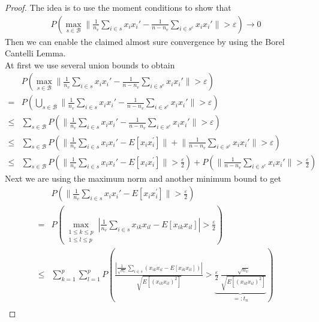 \documentclass[Research_Module_ES.tex]{subfiles}
\begin{document}
\begin{proof}
 The idea is to use the moment conditions to show that 
 \begin{align*}
 P\left( \max_{s\in \mathcal{B}}\biggl\lVert \frac{1}{n_v}\sum_{i\in s}x_ix_i' - \frac{1}{n-n_v}\sum_{i\in s^c}x_ix_i'\biggr\rVert>\varepsilon\right)\to0
 \end{align*}
Then we can enable the claimed almost sure convergence by using the Borel Cantelli Lemma.\\

At first we use several union bounds to obtain
\begin{align}\nonumber
&P\left( \max_{s\in \mathcal{B}}\biggl\lVert \frac{1}{n_v}\sum_{i\in s}x_ix_i' - \frac{1}{n-n_v}\sum_{i\in s^c}x_ix_i'\biggr\rVert>\varepsilon\right)\\\nonumber
=&P\left( \bigcup_{s\in \mathcal{B}}\biggl\lVert \frac{1}{n_v}\sum_{i\in s}x_ix_i' - \frac{1}{n-n_v}\sum_{i\in s^c}x_ix_i'\biggr\rVert>\varepsilon\right)\\\nonumber
\leq&\sum_{s\in \mathcal{B}}P\left(\biggl\lVert \frac{1}{n_v}\sum_{i\in s}x_ix_i' - \frac{1}{n-n_v}\sum_{i\in s^c}x_ix_i'\biggr\rVert>\varepsilon\right)\\\nonumber
\leq&\sum_{s\in \mathcal{B}}P\left(\biggl\lVert \frac{1}{n_v}\sum_{i\in s}x_ix_i'-E[x_i x_i^\prime]\biggr\rVert+\biggl\lVert \frac{1}{n-n_v}\sum_{i\in s^c}x_ix_i'\biggr\rVert>\varepsilon\right)\\
\leq&\sum_{s\in \mathcal{B}}P\left(\biggl\lVert \frac{1}{n_v}\sum_{i\in s}x_ix_i'-E[x_i x_i^\prime]\biggr\rVert>\frac{\varepsilon}{2}\right)+P\left(\biggl\lVert \frac{1}{n-n_v}\sum_{i\in s^c}x_ix_i'\biggr\rVert>\frac{\varepsilon}{2}\right)\label{Viereck}
\end{align}
Next we are using the maximum norm and another minimum bound to get
\begin{align}\nonumber
&P\left(\biggl\lVert \frac{1}{n_v}\sum_{i\in s}x_ix_i'-E[x_i x_i^\prime]\biggr\rVert>\frac{\varepsilon}{2}\right)\\\nonumber
=&P\left(\max_{\substack{1\leq k \leq p \\1\leq l\leq p}}\left| \frac{1}{n_v}\sum_{i\in s}x_{ik}x_{il}-E[x_{ik} x_{il}]\right|>\frac{\varepsilon}{2}\right)\\\nonumber
\leq& \sum_{k=1}^{p}\sum_{l=1}^{p}P\left( \frac{\left|\frac{1}{\sqrt{n_v}}\sum_{i\in s}\left(x_{ik}x_{il}-E[x_{ik}x_{il}]\right)\right|}{\sqrt{E[(x_{ik}x_{il})^2]}}>\underbrace{\frac{\varepsilon}{2}~ \frac{\sqrt{n_v}}{\sqrt{E[(x_{ik}x_{il})^2]}}}_{=:t_n}\right)\\

\end{align}
\end{proof}
\end{document}
